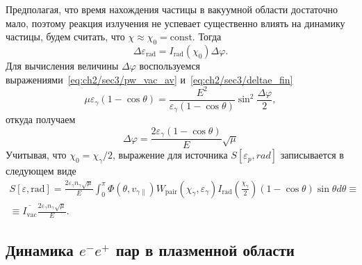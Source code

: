 Предполагая, что время нахождения частицы в вакуумной области достаточно мало, поэтому реакция излучения не успевает существенно влиять на динамику частицы, будем считать, что $\chi\approx\chi_0=\text{const}$.
Тогда
\begin{equation}
    \Delta\varepsilon_\mathrm{rad} = I_\mathrm{rad}(\chi_0)\Delta\varphi.
\end{equation}
Для вычисления величины $\Delta\varphi$ воспользуемся выражениями~\eqref{eq:ch2/sec3/pw_vac_av} и~\eqref{eq:ch2/sec3/deltae_fin}
\begin{equation}
    \mu \varepsilon_\gamma (1 - \cos\theta) = \frac{E^2}{\varepsilon_\gamma (1 - \cos\theta)}\sin^2\frac{\Delta\varphi}{2},
\end{equation}
откуда получаем
\begin{equation}
    \Delta\varphi =  \frac{2\varepsilon_\gamma (1 - \cos\theta)}{E}\sqrt{\mu}
\end{equation}
Учитывая, что $\chi_0 = \chi_\gamma / 2$, выражение для источника $S[\varepsilon_p, rad]$ записывается в следующем виде
\begin{multline}
    S[\varepsilon, \mathrm{rad}] = \frac{2 \varepsilon_\gamma n_\gamma \sqrt{\mu}}{E} \int_0^\pi \Phi(\theta, v_{\gamma\parallel}) W_\mathrm{pair}(\chi_\gamma, \varepsilon_\gamma) I_\mathrm{rad} \left( \frac{\chi_\gamma}{2} \right)(1 - \cos\theta)\sin\theta d\theta \equiv \\
    \equiv \overline{I_\mathrm{vac}} \frac{2 \varepsilon_\gamma n_\gamma \sqrt{\mu}}{E} .
\end{multline}

\subsection{Динамика $e^-e^+$ пар в плазменной области}
\label{sub.Pairs}

